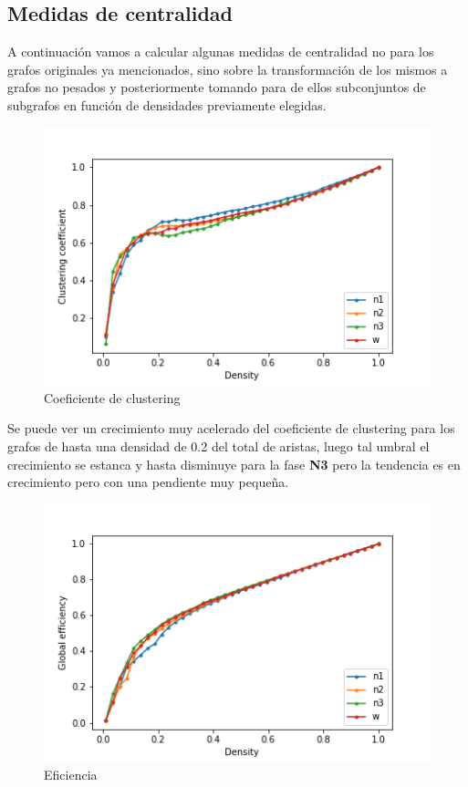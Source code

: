 \subsection{Medidas de centralidad}
A continuación vamos a calcular algunas medidas de centralidad no para los grafos originales ya mencionados, sino sobre la transformación de los mismos a grafos no pesados y posteriormente tomando para de ellos subconjuntos de subgrafos en función de densidades previamente elegidas.

\begin{figure}[H]
    \centering
    \includegraphics[width = 6in]{img/clust_coeff.png}
    \caption{Coeficiente de clustering}
    \label{fig:clust-coef}
\end{figure}

Se puede ver un crecimiento muy acelerado del coeficiente de clustering para los grafos de hasta una densidad de 0.2 del total de aristas, luego tal umbral el crecimiento se estanca y hasta disminuye para la fase \textbf{N3} pero la tendencia es en crecimiento pero con una pendiente muy pequeña.

\begin{figure}[H]
    \centering
    \includegraphics[width = 6in]{img/efficiency.png}
    \caption{Eficiencia}
    \label{fig:efficiency}
\end{figure}


